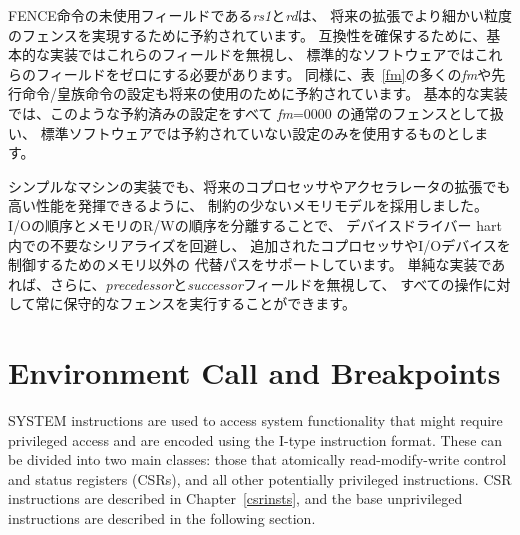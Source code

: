 FENCE命令の未使用フィールドである{\em rs1}と{\em rd}は、
将来の拡張でより細かい粒度のフェンスを実現するために予約されています。 
互換性を確保するために、基本的な実装ではこれらのフィールドを無視し、
標準的なソフトウェアではこれらのフィールドをゼロにする必要があります。
同様に、表~\ref{fm}の多くの{\em fm}や先行命令/皇族命令の設定も将来の使用のために予約されています。 
基本的な実装では、このような予約済みの設定をすべて {\em fm}=0000 の通常のフェンスとして扱い、
標準ソフトウェアでは予約されていない設定のみを使用するものとします。

\begin{commentary}
\begin{comment}
We chose a relaxed memory model to allow high performance from simple
machine implementations and from likely future
coprocessor or accelerator extensions.  We separate out I/O ordering
from memory R/W ordering to avoid unnecessary serialization within a
device-driver hart and also to support alternative non-memory paths
to control added coprocessors or I/O devices.  Simple implementations
may additionally ignore the {\em predecessor} and {\em successor}
fields and always execute a conservative fence on all operations.
\end{comment}

シンプルなマシンの実装でも、将来のコプロセッサやアクセラレータの拡張でも高い性能を発揮できるように、
制約の少ないメモリモデルを採用しました。
I/Oの順序とメモリのR/Wの順序を分離することで、
デバイスドライバー hart内での不要なシリアライズを回避し、
追加されたコプロセッサやI/Oデバイスを制御するためのメモリ以外の
代替パスをサポートしています。 
単純な実装であれば、さらに、{\em precedessor}と{\em successor}フィールドを無視して、
すべての操作に対して常に保守的なフェンスを実行することができます。
\end{commentary}

\section{Environment Call and Breakpoints}

SYSTEM instructions are used to access system functionality that might
require privileged access and are encoded using the I-type instruction
format.  These can be divided into two main classes: those that
atomically read-modify-write control and status registers (CSRs), and
all other potentially privileged instructions. CSR instructions are
described in Chapter~\ref{csrinsts}, and the base unprivileged instructions
are described in the following section.

